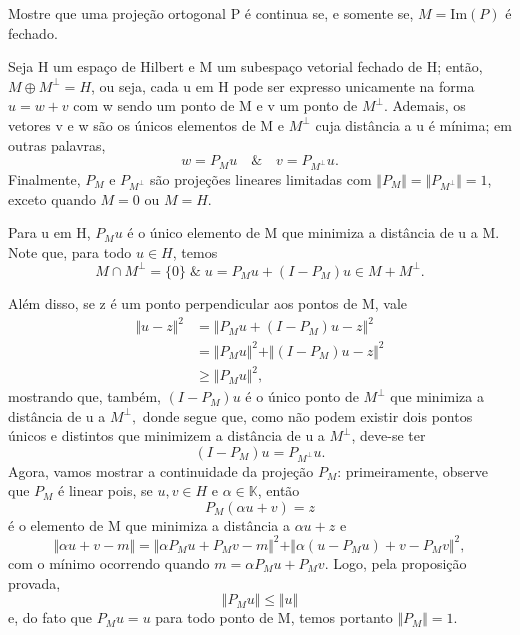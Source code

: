\documentclass[../functional_analysis.tex]{subfiles}
\begin{document}
\begin{exr}
	Mostre que uma projeção ortogonal P é continua se, e somente se, \(M = \mathrm{Im}(P)\) é fechado.
\end{exr}
\begin{theorem*}
	Seja H um espaço de Hilbert e M um subespaço vetorial fechado de H; então, \(M \oplus M^{\perp } = H\), ou seja, cada u em H pode ser expresso unicamente na forma \(u= w + v\) com w sendo um ponto de M e v um ponto de \(M^{\perp }.\) Ademais, os vetores v e w são os únicos elementos de M e \(M^{\perp } \) cuja distância a u é mínima; em outras palavras,
	\[
		w = P_{M}u \quad\&\quad v = P_{M^{\perp }}u.
	\]
	Finalmente, \(P_{M}\) e \(P_{M^{\perp }}\) são projeções lineares limitadas com \(\Vert P_{M} \Vert = \Vert P_{M^{\perp }} \Vert = 1\), exceto quando \(M=0\) ou \(M=H.\)
\end{theorem*}
\begin{proof*}
	Para u em H, \(P_{M}u\) é o único elemento de M que minimiza a distância de u a M. Note que, para todo \(u\in H\), temos
	\[
		M\cap M^{\perp } = \{0\}\;\&\; u = P_{M}u + (I-P_{M})u\in M + M^{\perp }.
	\]

	Além disso, se z é um ponto perpendicular aos pontos de M, vale
	\begin{align*}
		\Vert u-z \Vert^{2} & = \Vert P_{M}u + (I-P_{M})u - z \Vert^{2}                 \\
		                    & = \Vert P_{M}u \Vert^{2} + \Vert (I-P_{M})u - z \Vert^{2} \\
		                    & \geq \Vert P_{M}u \Vert^{2},
	\end{align*}
	mostrando que, também, \((I-P_{M})u\) é o único ponto de \(M^{\perp }\) que minimiza a distância de u a \(M^{\perp },\) donde segue que, como não podem existir dois pontos únicos e distintos que minimizem a distância de u a \( M^{\perp }\), deve-se ter
	\[
		(I-P_{M})u = P_{M^{\perp }}u.
	\]
	Agora, vamos mostrar a continuidade da projeção \(P_{M}\): primeiramente, observe que \(P_{M}\) é linear pois, se \(u, v\in H\) e \(\alpha \in \mathbb{K}\), então
	\[
		P_{M}(\alpha u+v) = z
	\]
	é o elemento de M que minimiza a distância a \(\alpha u + z\) e
	\[
		\Vert \alpha u + v - m \Vert = \Vert \alpha P_{M}u + P_{M}v - m \Vert^{2} + \Vert \alpha (u-P_{M}u) + v - P_{M}v \Vert^{2},
	\]
	com o mínimo ocorrendo quando \(m = \alpha P_{M}u + P_{M}v\). Logo, pela proposição provada,
	\[
		\Vert P_{M}u \Vert \leq \Vert u \Vert
	\]
	e, do fato que \(P_{M}u = u \) para todo ponto de M, temos portanto \(\Vert P_{M} \Vert =1.\) \qedsymbol
\end{proof*}
\end{document}

